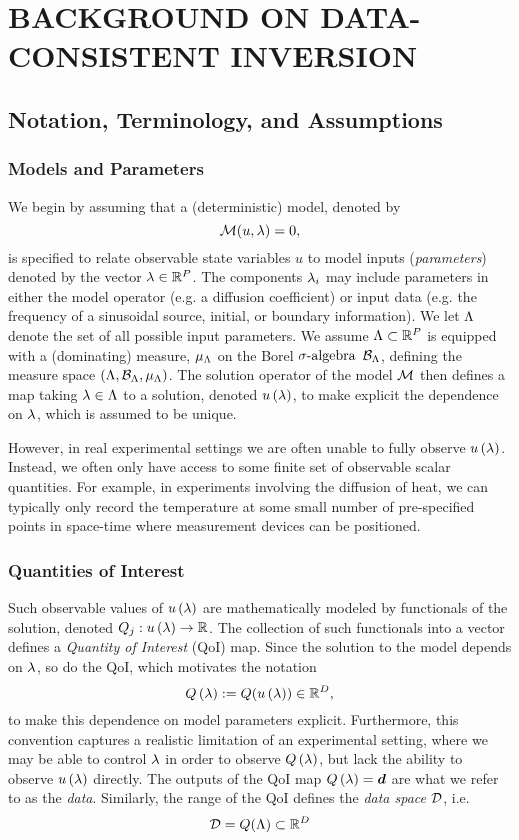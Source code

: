 \chapter{\uppercase{Background on Data-Consistent Inversion} \label{chapter:02}}

\section{Notation, Terminology, and Assumptions}
\subsection{Models and Parameters}
We begin by assuming that a (deterministic) model, denoted by $$\mathcal{M} (u, \lambda) = 0,$$ is specified to relate observable state variables $u$ to model inputs ({\em parameters}) denoted by the vector $\lambda\in\mathbb{R}^P$.
The components $\lambda_i$ may include parameters in either the model operator (e.g. a diffusion coefficient) or input data (e.g. the frequency of a sinusoidal source, initial, or boundary information).
We let ${\Lambda}$ denote the set of all possible input parameters.
We assume ${\Lambda}\subset\mathbb{R}^P$ is equipped with a (dominating) measure, $\mu_{{\Lambda}}$ on the Borel $\sigma\text{-algebra}$ $\mathcal{B}_{{\Lambda}}$, defining the measure space $({\Lambda}, \mathcal{B}_{{\Lambda}}, \mu_{{\Lambda}})$.
The solution operator of the model $\mathcal{M}$ then defines a map taking $\lambda\in{\Lambda}$ to a solution, denoted $u\left ( \lambda \right )$, to make explicit the dependence on $\lambda$, which is assumed to be unique.

However, in real experimental settings we are often unable to fully observe $u\left ( \lambda \right )$. 
Instead, we often only have access to some finite set of observable scalar quantities.
For example, in experiments involving the diffusion of heat, we can typically only record the temperature at some small number of pre-specified points in space-time where measurement devices can be positioned.

\subsection{Quantities of Interest}
Such observable values of $u\left ( \lambda \right )$ are mathematically modeled by functionals of the solution, denoted $Q_j: u\left ( \lambda \right ) \to \mathbb{R}$.
The collection of such functionals into a vector defines a {\em Quantity of Interest} (QoI) map.
Since the solution to the model depends on $\lambda$, so do the QoI, which motivates the notation
$$Q\left ( \lambda \right ) := Q( u\left ( \lambda \right ) ) \in\mathbb{R}^D,$$
to make this dependence on model parameters explicit.
Furthermore, this convention captures a realistic limitation of an experimental setting, where we may be able to control $\lambda$ in order to observe $Q\left ( \lambda \right )$, but lack the ability to observe $u\left ( \lambda \right )$ directly.
The outputs of the QoI map $Q\left ( \lambda \right ) = \operatorname*{\boldsymbol{d}}$ are what we refer to as the \emph{data}.
Similarly, the range of the QoI defines the \emph{data space} $\mathcal{D}$, i.e.
$$\mathcal{D} = Q({\Lambda}) \subset \mathbb{R}^D$$

